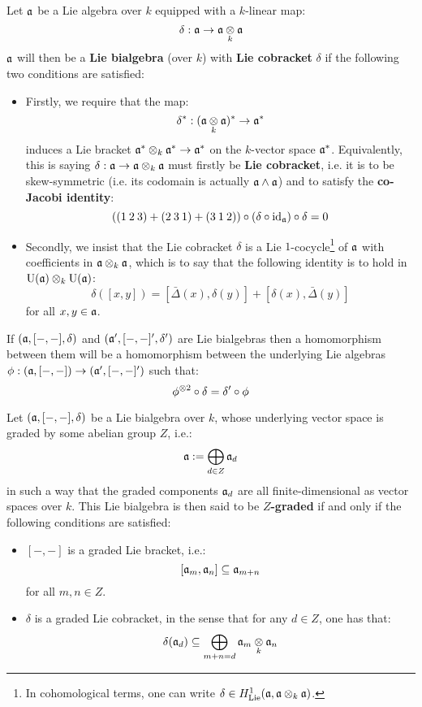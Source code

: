         \begin{definition} \label{def: lie_bialgebras}
            Let $\mathfrak{a}$ be a Lie algebra over $k$ equipped with a $k$-linear map:
                $$\delta: \a \to \a \tensor_k \a$$
            $\mathfrak{a}$ will then be a \textbf{Lie bialgebra} (over $k$) with \textbf{Lie cobracket} $\delta$ if the following two conditions are satisfied:
            \begin{itemize}
                \item Firstly, we require that the map:
                    $$\delta^*: (\a \tensor_k \a)^* \to \a^*$$
                induces a Lie bracket $\a^* \tensor_k \a^* \to \a^*$ on the $k$-vector space $\mathfrak{a}^*$. Equivalently, this is saying $\delta: \a \to \a \tensor_k \a$ must firstly be \textbf{Lie cobracket}, i.e. it is to be skew-symmetric (i.e. its codomain is actually $\mathfrak{a} \wedge \mathfrak{a}$) and to satisfy the \textbf{co-Jacobi identity}:
                    $$( (1 \: 2 \: 3) + (2 \: 3 \: 1) + (3 \: 1 \: 2) ) \circ (\delta \circ \mathrm{id}_{\mathfrak{a}}) \circ \delta = 0$$
                \item Secondly, we insist that the Lie cobracket $\delta$ is a Lie $1$-cocycle\footnote{In cohomological terms, one can write $\delta \in H^1_{\Lie}(\a, \a \tensor_k \a)$.} of $\mathfrak{a}$ with coefficients in $\a \tensor_k \a$, which is to say that the following identity is to hold in $\rmU(\a) \tensor_k \rmU(\a)$:
                    $$\delta( [x, y] ) = [\bar{\Delta}(x), \delta(y)] + [\delta(x), \bar{\Delta}(y)]$$
                for all $x, y \in \mathfrak{a}$.
            \end{itemize}
            If $(\mathfrak{a}, [-, -], \delta)$ and $(\mathfrak{a}', [-, -]', \delta')$ are Lie bialgebras then a homomorphism between them will be a homomorphism between the underlying Lie algebras $\phi: (\mathfrak{a}, [-, -]) \to (\mathfrak{a}', [-, -]')$ such that:
                $$\phi^{\tensor 2} \circ \delta = \delta' \circ \phi$$
        \end{definition}
        \begin{definition} \label{def: graded_lie_bialgberas}
            Let $(\mathfrak{a}, [-, -], \delta)$ be a Lie bialgebra over $k$, whose underlying vector space is graded by some abelian group $Z$, i.e.:
                $$\mathfrak{a} := \bigoplus_{d \in Z} \mathfrak{a}_d$$
            in such a way that the graded components $\mathfrak{a}_d$ are all finite-dimensional as vector spaces over $k$. This Lie bialgebra is then said to be \textbf{$Z$-graded} if and only if the following conditions are satisfied:
            \begin{itemize}
                \item $[-, -]$ is a graded Lie bracket, i.e.:
                    $$[\mathfrak{a}_m, \mathfrak{a}_n] \subseteq \mathfrak{a}_{m + n}$$
                for all $m, n \in Z$.
                \item $\delta$ is a graded Lie cobracket, in the sense that for any $d \in Z$, one has that:
                    $$\delta(\a_d) \subseteq \bigoplus_{m + n = d} \a_m \tensor_k \a_n$$
            \end{itemize}
        \end{definition}
